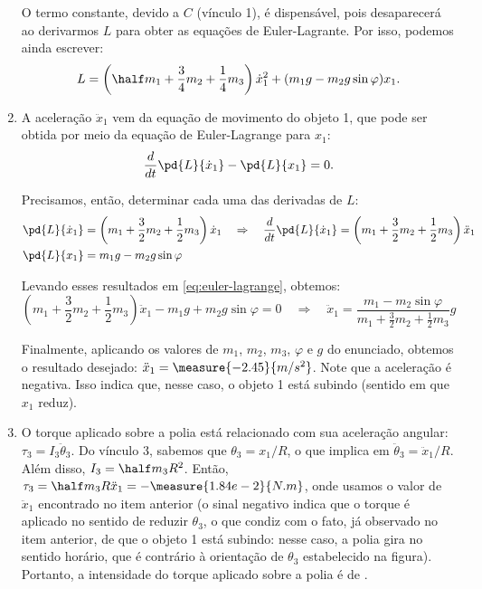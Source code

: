 \begin{question}
\begin{solution}
\begin{enumerate}
			O termo constante, devido a $C$ (vínculo 1), é dispensável, pois desaparecerá ao derivarmos $L$ para obter as equações de Euler-Lagrante.
			Por isso, podemos ainda escrever:
			\begin{equation*}
				L = \left(\half m_1 + \frac{3}{4}m_2 + \frac{1}{4}m_3\right)\dot x_1^2 + (m_1 g - m_2 g \sin\varphi)x_1.
			\end{equation*}

			\item A aceleração $\ddot x_1$ vem da equação de movimento do objeto 1, que pode ser obtida por meio da equação de Euler-Lagrange para $x_1$:
			\begin{equation}\label{eq:euler-lagrange}
				\frac{d}{dt}\pd{L}{\dot x_1} - \pd{L}{x_1} = 0.
			\end{equation}

			Precisamos, então, determinar cada uma das derivadas de $L$:
			\begin{align*}
				\pd{L}{\dot x_1} &= \left(m_1 + \frac{3}{2}m_2 + \frac{1}{2}m_3\right)\dot x_1 \quad\Rightarrow\quad
					\frac{d}{dt}\pd{L}{\dot x_1} = \left(m_1 + \frac{3}{2}m_2 + \frac{1}{2}m_3\right)\ddot x_1 \\
				\pd{L}{x_1} &= m_1g - m_2g\sin\varphi
			\end{align*}

			Levando esses resultados em \eqref{eq:euler-lagrange}, obtemos:
			\begin{equation*}
				\left(m_1 + \frac{3}{2}m_2 + \frac{1}{2}m_3\right)\ddot x_1 - m_1 g + m_2 g \sin \varphi = 0
				\quad\Rightarrow\quad
				\ddot x_1 = \frac{m_1 - m_2 \sin \varphi}{m_1 + \frac{3}{2}m_2 + \frac{1}{2}m_3}g
			\end{equation*}

			Finalmente, aplicando os valores de $m_1$, $m_2$, $m_3$, $\varphi$ e $g$ do enunciado, obtemos o resultado desejado: $\ddot x_1 = \measure{-2.45}{m/s^2}$. %
			Note que a aceleração é negativa.
			Isso indica que, nesse caso, o objeto 1 está subindo (sentido em que $x_1$ reduz).

			\item O torque aplicado sobre a polia está relacionado com sua aceleração angular: $\tau_3 = I_3 \ddot\theta_3$.
			Do vínculo 3, sabemos que $\theta_3 = x_1/R$, o que implica em $\ddot\theta_3 = \ddot x_1/R$.
			Além disso, $I_3 = \half m_3 R^2$.
			Então, $\tau_3 = \half m_3 R \ddot x_1 = -\measure{1.84e-2}{N.m}$, onde usamos o valor de $\ddot x_1$ encontrado no item anterior (o sinal negativo indica que o torque é aplicado no sentido de reduzir $\theta_3$, o que condiz com o fato, já observado no item anterior, de que o objeto 1 está subindo: nesse caso, a polia gira no sentido horário, que é contrário à orientação de $\theta_3$ estabelecido na figura). %
			Portanto, a intensidade do torque aplicado sobre a polia é de . %
		\end{enumerate}
	\end{solution}
\end{question}